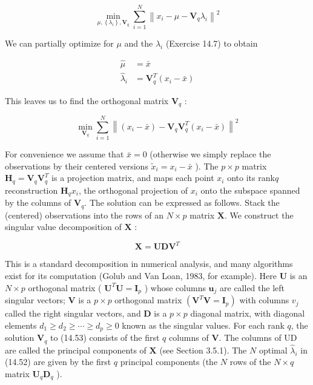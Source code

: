 \documentclass[10pt]{article}
\begin{document}
\begin{equation*}
\min _{\mu,\left\{\lambda_{i}\right\}, \mathbf{V}_{q}} \sum_{i=1}^{N}\left\|x_{i}-\mu-\mathbf{V}_{q} \lambda_{i}\right\|^{2} \tag{14.50}
\end{equation*}


We can partially optimize for $\mu$ and the $\lambda_{i}$ (Exercise 14.7) to obtain


\begin{align*}
\hat{\mu} & =\bar{x}  \tag{14.51}\\
\hat{\lambda}_{i} & =\mathbf{V}_{q}^{T}\left(x_{i}-\bar{x}\right) \tag{14.52}
\end{align*}


This leaves us to find the orthogonal matrix $\mathbf{V}_{q}$ :


\begin{equation*}
\min _{\mathbf{V}_{q}} \sum_{i=1}^{N}\left\|\left(x_{i}-\bar{x}\right)-\mathbf{V}_{q} \mathbf{V}_{q}^{T}\left(x_{i}-\bar{x}\right)\right\|^{2} \tag{14.53}
\end{equation*}


For convenience we assume that $\bar{x}=0$ (otherwise we simply replace the observations by their centered versions $\tilde{x}_{i}=x_{i}-\bar{x}$ ). The $p \times p$ matrix $\mathbf{H}_{q}=\mathbf{V}_{q} \mathbf{V}_{q}^{T}$ is a projection matrix, and maps each point $x_{i}$ onto its rank$q$ reconstruction $\mathbf{H}_{q} x_{i}$, the orthogonal projection of $x_{i}$ onto the subspace spanned by the columns of $\mathbf{V}_{q}$. The solution can be expressed as follows. Stack the (centered) observations into the rows of an $N \times p$ matrix $\mathbf{X}$. We construct the singular value decomposition of $\mathbf{X}$ :


\begin{equation*}
\mathbf{X}=\mathbf{U D V}^{T} \tag{14.54}
\end{equation*}


This is a standard decomposition in numerical analysis, and many algorithms exist for its computation (Golub and Van Loan, 1983, for example). Here $\mathbf{U}$ is an $N \times p$ orthogonal matrix ( $\mathbf{U}^{T} \mathbf{U}=\mathbf{I}_{p}$ ) whose columns $\mathbf{u}_{j}$ are called the left singular vectors; $\mathbf{V}$ is a $p \times p$ orthogonal matrix $\left(\mathbf{V}^{T} \mathbf{V}=\mathbf{I}_{p}\right)$ with columns $v_{j}$ called the right singular vectors, and $\mathbf{D}$ is a $p \times p$ diagonal matrix, with diagonal elements $d_{1} \geq d_{2} \geq \cdots \geq d_{p} \geq 0$ known as the singular values. For each rank $q$, the solution $\mathbf{V}_{q}$ to (14.53) consists of the first $q$ columns of $\mathbf{V}$. The columns of UD are called the principal components of $\mathbf{X}$ (see Section 3.5.1). The $N$ optimal $\hat{\lambda}_{i}$ in (14.52) are given by the first $q$ principal components (the $N$ rows of the $N \times q$ matrix $\mathbf{U}_{q} \mathbf{D}_{q}$ ).
\end{document}

